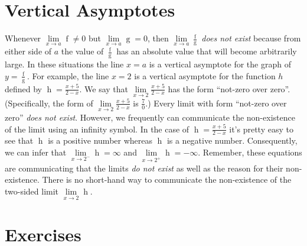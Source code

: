 \documentclass[12pt,]{book}
\theoremstyle{plain}
\theoremstyle{definition}
\numberwithin{equation}{section}
\newcommand{\fe}[2]{\mathop{{#1}{\left(#2\right)}}}
\begin{document}
\section[Vertical Asymptotes]{Vertical Asymptotes}\label{section-vertical-asymptotes}
Whenever \(\lim\limits_{x\to a}\fe{f}{x}\neq0\) but \(\lim\limits_{x\to a}\fe{g}{x}=0\), then \(\lim\limits_{x\to a}\frac{\fe{f}{x}}{\fe{g}{x}}\) \emph{does not exist} because from either side of \(a\) the value of \(\frac{\fe{f}{x}}{\fe{g}{x}}\) has an absolute value that will become arbitrarily large. In these situations the line \(x=a\) is a vertical asymptote for the graph of \(y=\frac{\fe{f}{x}}{\fe{g}{x}}\). For example, the line \(x=2\) is a vertical asymptote for the function \(h\) defined by \(\fe{h}{x}=\frac{x+5}{2-x}\). We say that \(\lim\limits_{x\to 2}\frac{x+5}{2-x}\) has the form ``not-zero over zero''. (Specifically, the form of \(\lim\limits_{x\to 2}\frac{x+5}{2-x}\) is \(\frac{7}{0}\).) Every limit with form ``not-zero over zero'' \emph{does not exist}. However, we frequently can communicate the non-existence of the limit using an infinity symbol. In the case of \(\fe{h}{x}=\frac{x+5}{2-x}\) it's pretty easy to see that \(\fe{h}{1.99}\) is a positive number whereas \(\fe{h}{2.01}\) is a negative number. Consequently, we can infer that \(\lim\limits_{x\to 2^{-}}\fe{h}{x}=\infty\) and \(\lim\limits_{x\to 2^{+}}\fe{h}{x}=-\infty\). Remember, these equations are communicating that the limits \emph{do not exist} as well as the reason for their non-existence. There is no short-hand way to communicate the non-existence of the two-sided limit \(\lim\limits_{x\to 2}\fe{h}{x}\).%
\typeout{************************************************}
\typeout{************************************************}
\section*{Exercises}\label{exercises-12}
\end{document}
